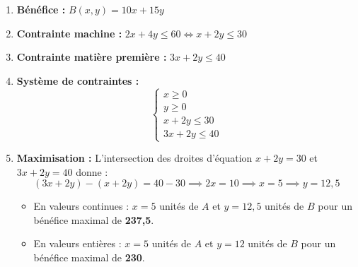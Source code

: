 \documentclass[12pt,a4paper]{article}
\begin{document}
\begin{enumerate}
    \item \textbf{Bénéfice :} $B(x, y) = 10x + 15y$
    \item \textbf{Contrainte machine :} $2x + 4y \le 60 \iff x + 2y \le 30$
    \item \textbf{Contrainte matière première :} $3x + 2y \le 40$
    \item \textbf{Système de contraintes :}
    \[
    \begin{cases}
    x \ge 0 \\
    y \ge 0 \\
    x + 2y \le 30 \\
    3x + 2y \le 40
    \end{cases}
    \]
    \item \textbf{Maximisation :}
    L'intersection des droites d'équation $x + 2y = 30$ et $3x + 2y = 40$ donne :
    \[
    (3x + 2y) - (x + 2y) = 40 - 30 \implies 2x = 10 \implies x = 5 \implies y = 12,5
    \]
    \begin{itemize}[label=$\bullet$]
        \item En valeurs continues : $x = 5$ unités de $A$ et $y = 12,5$ unités de $B$ pour un bénéfice maximal de \textbf{237,5}.
        \item En valeurs entières : $x = 5$ unités de $A$ et $y = 12$ unités de $B$ pour un bénéfice maximal de \textbf{230}.
    \end{itemize}
\end{enumerate}
\end{document}
